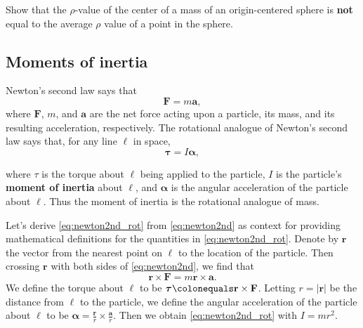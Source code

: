 \documentclass{watsonbook}
\begin{document}
\begin{exercise}{}{}
  Show that the $\rho$-value of the center of a mass of an origin-centered sphere is \textbf{not} equal to the average $\rho$ value of a point in the sphere. 
\end{exercise}

\subsection{Moments of inertia}


Newton's second law says that
\begin{equation} \label{eq:newton2nd} 
  \mathbf{F} = m \mathbf{a},
\end{equation}
where $\mathbf{F}$, $m$, and $\mathbf{a}$ are the net force acting upon a particle, its mass, and its resulting acceleration, respectively. The rotational analogue of Newton's second law says that, for any line $\ell$ in space, 
\begin{equation} \label{eq:newton2nd_rot} 
  {\bm \tau} = I {\bm \alpha}, 
\end{equation}
\begin{minipage}[t]{0.7\textwidth}
  where $\tau$ is the torque about $\ell$ being applied to the
  particle, $I$ is the particle's \textbf{moment of inertia} about
  $\ell$, and ${\bm \alpha}$ is the angular acceleration of the
  particle about $\ell$. Thus the moment of inertia is the rotational
  analogue of mass.
  
  Let's derive \eqref{eq:newton2nd_rot} from \eqref{eq:newton2nd} as context for providing mathematical definitions for the quantities in \eqref{eq:newton2nd_rot}. Denote by $\mathbf{r}$ the vector from the nearest point on $\ell$ to the location of the particle. Then crossing $\mathbf{r}$ with both sides of \eqref{eq:newton2nd}, we find that
\[
  \mathbf{r} \times \mathbf{F} = m \mathbf{r} \times \mathbf{a}. 
\]
We define the torque about $\ell$ to be ${\bm \tau} \colonequals
\mathbf{r} \times \mathbf{F}$. Letting $r = |\mathbf{r}|$ be the
distance from $\ell$ to the particle, we define the angular
acceleration of the particle about $\ell$ to be ${\bm \alpha} =
\frac{\mathbf{r}}{r} \times \frac{\mathbf{a}}{r}$. Then we obtain
\eqref{eq:newton2nd_rot} with $I = mr^2$.
\end{minipage}
\end{document}
